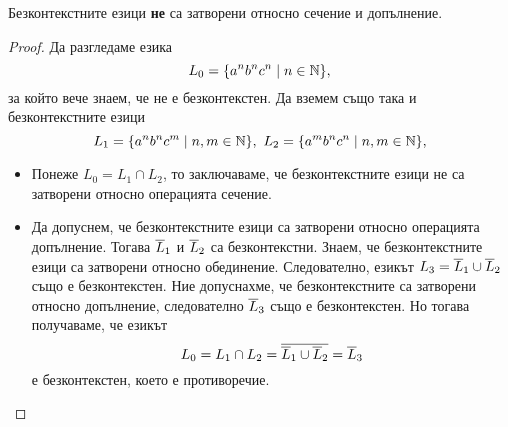 \begin{thm}
  Безконтекстните езици {\bf не} са затворени относно сечение и допълнение.
\end{thm}
\begin{proof}
  Да разгледаме езика
  \[L_0 = \{a^nb^nc^n\mid n\in\mathbb{N}\},\] за който вече знаем, че не е безконтекстен.
  Да вземем също така и безконтекстните езици 
  \[L_1 = \{a^nb^nc^m\mid n,m\in\mathbb{N}\},\ L_2 = \{a^mb^nc^n\mid n,m\in\mathbb{N}\},\]
  \begin{itemize}
  \item 
    Понеже $L_0 = L_1\cap L_2$, то заключаваме, че безконтекстните езици не са затворени 
    относно операцията сечение.
  \item
    Да допуснем, че безконтекстните езици са затворени относно операцията допълнение.
    Тогава  $\overline{L}_1$ и $\overline{L}_2$ са безконтекстни.
    Знаем, че безконтекстните езици са затворени относно обединение. 
    Следователно, езикът $L_3 = \overline{L}_1 \cup \overline{L}_2$ също е безконтекстен.
    Ние допуснахме, че безконтекстните са затворени относно допълнение, следователно $\overline{L}_3$
    също е безконтекстен.
    Но тогава получаваме, че езикът
    \[L_0 = L_1 \cap L_2 = \overline{\overline{L}_1 \cup \overline{L}_2} = \overline{L}_3\]
    е безконтекстен, което е противоречие.
  \end{itemize}
\end{proof}

